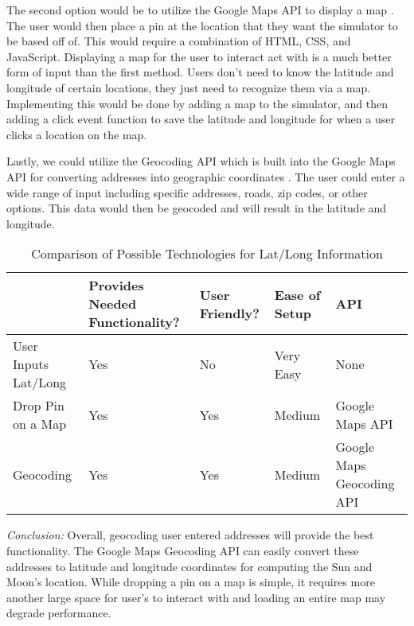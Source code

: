 \documentclass[10pt, onecolumn, draftclsnofoot, letterpaper, compsoc]{IEEEtran}
\begin{document}
The second option would be to utilize the Google Maps API to display a map
\cite{jsAPI}.
The user would then place a pin at the location that they want the simulator
to be based off of. This would require a combination of HTML, CSS, and
JavaScript. Displaying a map for the user to interact act with is a much
better form of input than the first method. Users don't need to know the
latitude and longitude of certain locations, they just need to recognize
them via a map. Implementing this would be done by adding a map to the
simulator, and then adding a click event function to save the latitude and
longitude for when a user clicks a location on the map.

Lastly, we could utilize the Geocoding API which is built into the Google Maps
API for converting addresses into geographic coordinates \cite{jsGEO}.
The user could enter a wide range of input including specific addresses,
roads, zip codes, or other options. This data would then be geocoded and will
result in the latitude and longitude.

\begin{table}[h]
\centering
\caption{Comparison of Possible Technologies for Lat/Long Information}
\begin{tabular}{|p{3.15cm}|p{3.15cm}|p{3.15cm}|p{3.15cm}|p{3.15cm}|}
\cline{5-4}

\hline  & Provides Needed Functionality? & User Friendly? & Ease of Setup
 & API \\ \hline

User Inputs Lat/Long & Yes & No & Very Easy & None \\ \hline

Drop Pin on a Map & Yes & Yes & Medium & Google Maps API \\ \hline

Geocoding & Yes & Yes & Medium & Google Maps Geocoding API \\ \hline

\end{tabular}
\label{table:Jake2}
\end{table}

\textit{Conclusion:} Overall, geocoding user entered addresses will provide the
best functionality. The Google Maps Geocoding API can easily convert these
addresses to latitude and longitude coordinates for computing the Sun and
Moon's location. While dropping a pin on a map is simple, it requires more
another large space for user's to interact with and loading an entire
map may degrade performance.
\end{document}
